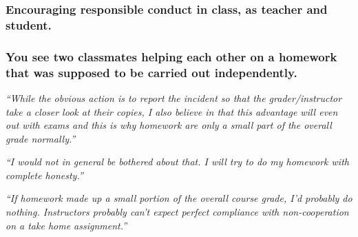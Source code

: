 \documentclass[12pt]{beamer}
\newcommand\ans[1]{{\it ``#1''}}
\begin{document}

\begin{frame}
  \frametitle{Encouraging responsible conduct in class, as teacher and student.}
\end{frame}

\begin{frame} %

\frametitle{You see two classmates helping each other on a homework that was supposed to be carried out independently.}


\ans{While the obvious action is to report the incident so that the grader/instructor take a closer look at their copies, I also believe in that this advantage will even out with exams and this is why homework are only a small part of the overall grade normally.}

\ans{I would not in general be bothered about that.  I will try to do my homework with complete honesty.}

\ans{If  homework  made  up  a  small  portion  of  the  overall  course  grade,  I’d  probably  do nothing.  Instructors probably can’t expect perfect compliance with non-cooperation on a take home assignment.}






\end{frame}
\end{document}
